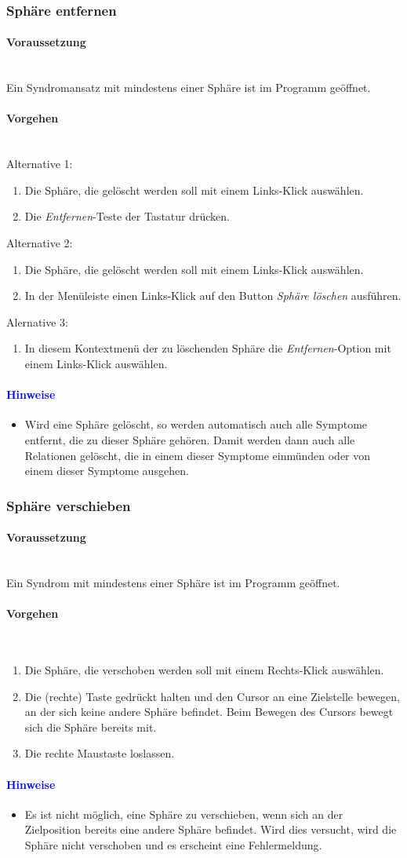 \documentclass[enabledeprecatedfontcommands,fontsize=11pt,paper=a4,twoside]{scrartcl}
\newcounter{one}
\newcommand*{\hint}{\paragraph{\textcolor{blue}{Hinweise}}}
\newcommand*{\condition}{\paragraph{Voraussetzung}$\;$ \vspace{0.2cm}\\}
\newcommand*{\actions}{\paragraph{Vorgehen} $\;$\vspace{0.2cm}\\}
\begin{document}
			\newpage	
		\subsubsection{Sphäre entfernen}
			\condition 	
		Ein Syndromansatz mit mindestens einer Sphäre ist im Programm geöffnet. 
		\actions  
		Alternative 1:
		\begin{enumerate}
			\item Die Sphäre, die gelöscht werden soll mit einem Links-Klick auswählen.
			\item Die \textit{Entfernen}-Teste der Tastatur drücken.
		\end{enumerate}
		Alternative 2:
			\begin{enumerate}
			\item Die Sphäre, die gelöscht werden soll mit einem Links-Klick auswählen.
			\item In der Menüleiste einen Links-Klick auf den Button \textit{Sphäre löschen} ausführen.
		\end{enumerate}
		Alernative 3:
		\begin{enumerate} 
			\item In diesem Kontextmenü der zu löschenden Sphäre die \textit{Entfernen}-Option mit einem Links-Klick auswählen.
		\end{enumerate}
		\hint
		\begin{itemize}
			\item Wird eine Sphäre gelöscht, so werden automatisch auch alle Symptome entfernt, die zu dieser Sphäre gehören. Damit werden dann auch alle Relationen gelöscht, die in einem dieser Symptome einmünden oder von einem dieser Symptome ausgehen.
		\end{itemize}
		
				\newpage	
		\subsubsection{Sphäre verschieben}
				\condition 	
		Ein Syndrom mit mindestens einer Sphäre ist im Programm geöffnet. 
		\actions  
		\begin{enumerate}
			\item Die Sphäre, die verschoben werden soll mit einem Rechts-Klick auswählen.
			\item Die (rechte) Taste gedrückt halten und den Cursor an eine Zielstelle bewegen, an der sich keine andere Sphäre befindet. Beim Bewegen des Cursors bewegt sich die Sphäre bereits mit. 
			\item Die rechte Maustaste loslassen.
		\end{enumerate}
		\hint
		\begin{itemize}
			\item Es ist nicht möglich, eine Sphäre zu verschieben, wenn sich an der Zielposition bereits eine andere Sphäre befindet. Wird dies versucht, wird die Sphäre nicht verschoben und es erscheint eine Fehlermeldung.
		\end{itemize}
		
\end{document}
